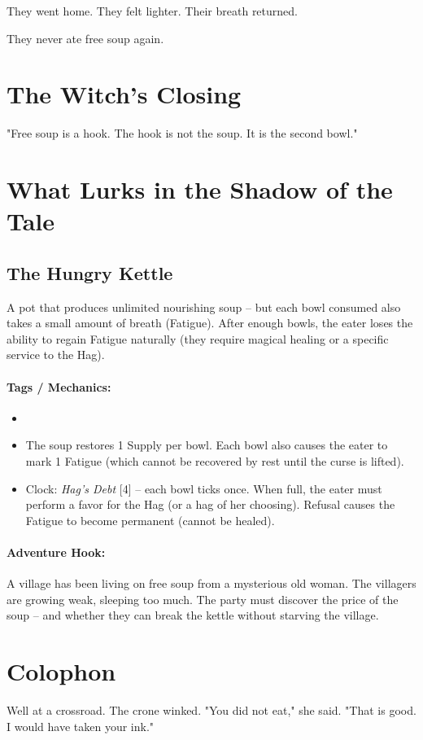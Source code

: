 They went home. They felt lighter. Their breath returned.

They never ate free soup again.

\section*{The Witch's Closing}
"Free soup is a hook. The hook is not the soup. It is the second bowl."

\section*{What Lurks in the Shadow of the Tale}

\subsection*{The Hungry Kettle}

A pot that produces unlimited nourishing soup -- but each bowl consumed also takes a small amount of breath (Fatigue). After enough bowls, the eater loses the ability to regain Fatigue naturally (they require magical healing or a specific service to the Hag).

\paragraph{Tags / Mechanics:}
\begin{itemize}
\item [HEAL] [CURSE]
\item The soup restores 1 Supply per bowl. Each bowl also causes the eater to mark 1 Fatigue (which cannot be recovered by rest until the curse is lifted).
\item Clock: \textit{Hag's Debt} [4] -- each bowl ticks once. When full, the eater must perform a favor for the Hag (or a hag of her choosing). Refusal causes the Fatigue to become permanent (cannot be healed).
\end{itemize}

\paragraph{Adventure Hook:}
A village has been living on free soup from a mysterious old woman. The villagers are growing weak, sleeping too much. The party must discover the price of the soup -- and whether they can break the kettle without starving the village.

\section*{Colophon}
Well at a crossroad. The crone winked. "You did not eat," she said. "That is good. I would have taken your ink."

